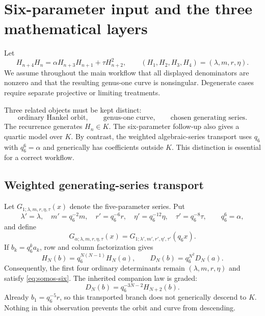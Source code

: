 \documentclass[11pt]{article}
\newcommand{\taupar}{\tau}
\begin{document}
\section{Six-parameter input and the three mathematical layers}
Let
\begin{equation}
 H_{n+4}H_n=\alpha H_{n+3}H_{n+1}+\taupar H_{n+2}^2,
 \qquad
 (H_1,H_2,H_3,H_4)=(\lambda,m,r,\eta).
 \label{eq:somos-six}
\end{equation}
We assume throughout the main workflow that all displayed denominators are
nonzero and that the resulting genus-one curve is nonsingular.  Degenerate
cases require separate projective or limiting treatments.

Three related objects must be kept distinct:
\[
 \text{ordinary Hankel orbit},\qquad
 \text{genus-one curve},\qquad
 \text{chosen generating series}.
\]
The recurrence generates $H_n\in K$.  The six-parameter follow-up also gives a
quartic model over $K$.  By contrast, the weighted algebraic-series transport
uses $q_6$ with $q_6^6=\alpha$ and generically has coefficients outside $K$.
This distinction is essential for a correct workflow.

\subsection{Weighted generating-series transport}
Let $G_{1;\lambda,m,r,\eta,\taupar}(x)$ denote the five-parameter series.  Put
\begin{equation}
 \lambda'=\lambda,\quad m'=q_6^{-2}m,\quad r'=q_6^{-6}r,
 \quad \eta'=q_6^{-12}\eta,\quad \taupar'=q_6^{-8}\taupar,
 \qquad q_6^6=\alpha,
 \label{eq:weighted-parameters}
\end{equation}
and define
\begin{equation}
 G_{\alpha;\lambda,m,r,\eta,\taupar}(x)
 =G_{1;\lambda',m',r',\eta',\taupar'}(q_6x).
 \label{eq:weighted-series}
\end{equation}
If $b_k=q_6^ka_k$, row and column factorization gives
\begin{equation}
 H_N(b)=q_6^{N(N-1)}H_N(a),\qquad
 D_N(b)=q_6^{N^2}D_N(a).
 \label{eq:hankel-weights}
\end{equation}
Consequently, the first four ordinary determinants remain
$(\lambda,m,r,\eta)$ and satisfy \cref{eq:somos-six}.  The inherited companion
law is graded:
\begin{equation}
 D_N(b)=q_6^{-3N-2}H_{N+2}(b).
 \label{eq:graded-companion}
\end{equation}
Already $b_1=q_6^{-5}r$, so this transported branch does not generically
descend to $K$.  Nothing in this observation prevents the orbit and curve from
descending.
\end{document}
